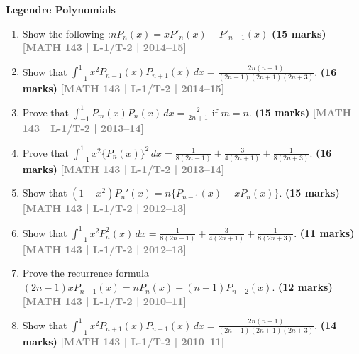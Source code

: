 \documentclass[12pt,a4paper]{article}
\newcommand{\yr}[1]{\hfill\textcolor{gray}{\small\textbf{[#1]}}}
\newcommand{\mk}[1]{\textcolor{orange!70!black}{\small\textbf{(#1 marks)}}}
\newcommand{\subtopic}[2]{%
  \vspace{10pt}
  \noindent\begin{tcolorbox}[colback=#1!8,colframe=#1,boxrule=0.6pt,arc=4pt,
    left=6pt,right=6pt,top=4pt,bottom=4pt]
    \small\bfseries\textcolor{#1}{#2}
  \end{tcolorbox}
  \vspace{2pt}
}
\begin{document}
\subtopic{cI}{Legendre Polynomials}
\label{sub:s11-legendre}



\begin{enumerate}
    
\item Show the following :$\displaystyle n P_n(x) = x P'_n(x) - P'_{n-1}(x)$ \hfill \mk{15}    
\yr{MATH 143 | L-1/T-2 | 2014--15}

    \item Show that $\displaystyle\int_{-1}^{1}x^{2}P_{n-1}(x)P_{n+1}(x)\,dx=\frac{2n(n+1)}{(2n-1)(2n+1)(2n+3)}$.
\mk{16} \yr{MATH 143 | L-1/T-2 | 2014--15}

\item Prove that $\displaystyle\int_{-1}^{1}P_{m}(x)P_{n}(x)\,dx=\frac{2}{2n+1}$ if $m=n$.
\mk{15} \yr{MATH 143 | L-1/T-2 | 2013--14}

\item Prove that $\displaystyle\int_{-1}^{1}x^{2}\{P_{n}(x)\}^{2}\,dx=\frac{1}{8(2n-1)}+\frac{3}{4(2n+1)}+\frac{1}{8(2n+3)}$.
\mk{16\textonehalf} \yr{MATH 143 | L-1/T-2 | 2013--14}

\item Show that $(1-x^{2})P_{n}'(x)=n\{P_{n-1}(x)-xP_{n}(x)\}$.
\mk{15} \yr{MATH 143 | L-1/T-2 | 2012--13}

\item Show that $\displaystyle\int_{-1}^{1}x^{2}P_{n}^{2}(x)\,dx=\frac{1}{8(2n-1)}+\frac{3}{4(2n+1)}+\frac{1}{8(2n+3)}$.
\mk{11\textonehalf} \yr{MATH 143 | L-1/T-2 | 2012--13}

\item Prove the recurrence formula $(2n-1)xP_{n-1}(x)=nP_{n}(x)+(n-1)P_{n-2}(x)$.
\mk{12} \yr{MATH 143 | L-1/T-2 | 2010--11}

\item Show that $\displaystyle\int_{-1}^{1}x^{2}P_{n+1}(x)P_{n-1}(x)\,dx=\frac{2n(n+1)}{(2n-1)(2n+1)(2n+3)}$.
\mk{14\textonehalf} \yr{MATH 143 | L-1/T-2 | 2010--11}

\end{enumerate}
\end{document}
